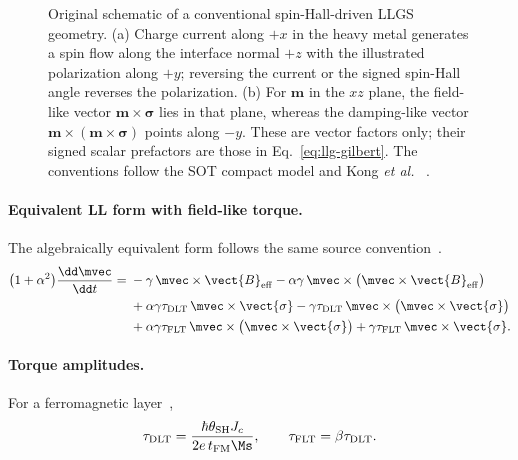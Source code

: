 \begin{figure}[htbp]
    \caption{Original schematic of a conventional spin-Hall-driven LLGS
    geometry.  (a) Charge current along $+x$ in the heavy metal generates a
    spin flow along the interface normal $+z$ with the illustrated polarization
    along $+y$; reversing the current or the signed spin-Hall angle reverses the
    polarization.  (b) For $\mathbf m$ in the $xz$ plane, the field-like vector
    $\mathbf m\times\boldsymbol{\sigma}$ lies in that plane, whereas the
    damping-like vector $\mathbf m\times(\mathbf m\times\boldsymbol{\sigma})$
    points along $-y$.  These are vector factors only; their signed scalar
    prefactors are those in Eq.~\eqref{eq:llg-gilbert}.  The conventions follow
    the SOT compact model and Kong \emph{et al.}
    ~\cite{sot-stt-compact-model,kong2026spatially}.}
    \label{fig:sot-llgs-geometry}
\end{figure}

\paragraph{Equivalent LL form with field-like torque.}
The algebraically equivalent form follows the same source
convention~\cite{kong2026spatially}.
\begin{align}
    \bigl(1+\alpha^2\bigr)\frac{\dd\mvec}{\dd t}
    ={}& -\gamma\,\mvec\times\vect{B}_{\mathrm{eff}}
         - \alpha\gamma\,\mvec\times
           \bigl(\mvec\times\vect{B}_{\mathrm{eff}}\bigr)
         \notag\\
       & + \alpha\gamma\tau_{\mathrm{DLT}}\,
           \mvec\times\vect{\sigma}
         - \gamma\tau_{\mathrm{DLT}}\,
           \mvec\times\bigl(\mvec\times\vect{\sigma}\bigr)
         \notag\\
       & + \alpha\gamma\tau_{\mathrm{FLT}}\,
           \mvec\times\bigl(\mvec\times\vect{\sigma}\bigr)
         + \gamma\tau_{\mathrm{FLT}}\,
           \mvec\times\vect{\sigma}.
    \label{eq:ll-with-flt}
\end{align}

\paragraph{Torque amplitudes.}
For a ferromagnetic layer~\cite{zhang2024revisiting},
\[
    \tau_{\mathrm{DLT}}
    = \frac{\hbar\theta_{\mathrm{SH}}J_c}
           {2e\,t_{\mathrm{FM}}\Ms},
    \qquad
    \tau_{\mathrm{FLT}}
    = \beta\tau_{\mathrm{DLT}}.
\]

